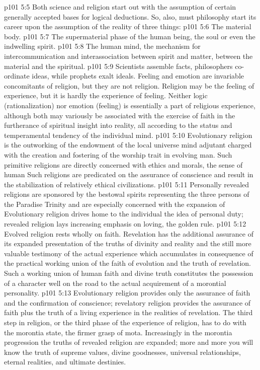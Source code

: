 \vs p101 5:5 \pc Both science and religion start out with the assumption of certain generally accepted bases for logical deductions. So, also, must philosophy start its career upon the assumption of the reality of three things:
\vs p101 5:6 \bibnobreakspace The material body.
\vs p101 5:7 \bibnobreakspace The supermaterial phase of the human being, the soul or even the indwelling spirit.
\vs p101 5:8 \bibnobreakspace The human mind, the mechanism for intercommunication and interassociation between spirit and matter, between the material and the spiritual.
\vs p101 5:9 \pc Scientists assemble facts, philosophers co\hyp{}ordinate ideas, while prophets exalt ideals. Feeling and emotion are invariable concomitants of religion, but they are not religion. Religion may be the feeling of experience, but it is hardly the experience of feeling. Neither logic (rationalization) nor emotion (feeling) is essentially a part of religious experience, although both may variously be associated with the exercise of faith in the furtherance of spiritual insight into reality, all according to the status and temperamental tendency of the individual mind.
\vs p101 5:10 Evolutionary religion is the outworking of the endowment of the local universe mind adjutant charged with the creation and fostering of the worship trait in evolving man. Such primitive religions are directly concerned with ethics and morals, the sense of human  Such religions are predicated on the assurance of conscience and result in the stabilization of relatively ethical civilizations.
\vs p101 5:11 Personally revealed religions are sponsored by the bestowal spirits representing the three persons of the Paradise Trinity and are especially concerned with the expansion of  Evolutionary religion drives home to the individual the idea of personal duty; revealed religion lays increasing emphasis on loving, the golden rule.
\vs p101 5:12 Evolved religion rests wholly on faith. Revelation has the additional assurance of its expanded presentation of the truths of divinity and reality and the still more valuable testimony of the actual experience which accumulates in consequence of the practical working union of the faith of evolution and the truth of revelation. Such a working union of human faith and divine truth constitutes the possession of a character well on the road to the actual acquirement of a morontial personality.
\vs p101 5:13 \pc Evolutionary religion provides only the assurance of faith and the confirmation of conscience; revelatory religion provides the assurance of faith plus the truth of a living experience in the realities of revelation. The third step in religion, or the third phase of the experience of religion, has to do with the morontia state, the firmer grasp of mota. Increasingly in the morontia progression the truths of revealed religion are expanded; more and more you will know the truth of supreme values, divine goodnesses, universal relationships, eternal realities, and ultimate destinies.
